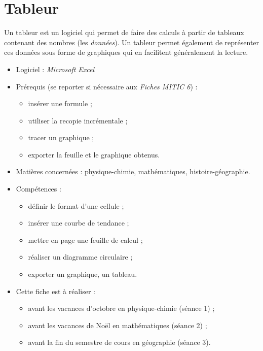 \chapter{Tableur}  

Un tableur est un logiciel qui permet de faire des calculs à partir de tableaux contenant des nombres (les \emph{données}). Un tableur permet également de représenter ces données sous forme de graphiques qui en facilitent généralement la lecture.

\phantom{rien}

{\footnotesize
\begin{itemize}
\item Logiciel : \emph{Microsoft Excel}
\item Prérequis (se reporter si nécessaire aux \emph{Fiches MITIC 6}) :
        \begin{itemize}
        \item insérer une formule ;
        \item utiliser la recopie incrémentale ;
        \item tracer un graphique ;
        \item exporter la feuille et le graphique obtenus.
        \end{itemize}
\item Matières concernées : physique-chimie, mathématiques, histoire-géographie.
\item Compétences : 
        \begin{itemize}
        \item définir le format d'une cellule ;
        \item insérer une courbe de tendance ;
        \item mettre en page une feuille de calcul ;
        \item réaliser un diagramme circulaire ;
        \item exporter un graphique, un tableau.
        \end{itemize}
\item Cette fiche est à réaliser :
        \begin{itemize}
        \item avant les vacances d'octobre en physique-chimie (séance 1) ;
        \item avant les vacances de Noël en mathématiques (séance 2) ;
        \item avant la fin du semestre de cours en géographie (séance 3). 
        \end{itemize}
\end{itemize}
}%

